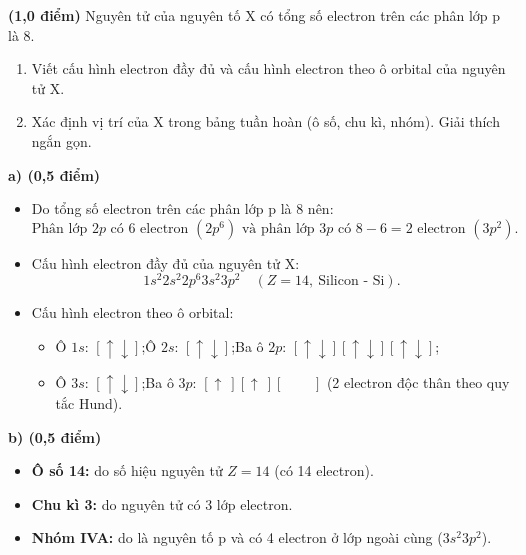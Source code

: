 \documentclass[11pt,a4paper]{article}
\begin{document}
\begin{ex}%
\textbf{(1,0 điểm)} Nguyên tử của nguyên tố X có tổng số electron trên các phân lớp p là 8.
\begin{enumerate}[label=\textbf{\alph*)}]
\item Viết cấu hình electron đầy đủ và cấu hình electron theo ô orbital của nguyên tử X.
\item Xác định vị trí của X trong bảng tuần hoàn (ô số, chu kì, nhóm). Giải thích ngắn gọn.
\end{enumerate}
\begin{loigiai}
\textbf{a) (0,5 điểm)}
\begin{itemize}[leftmargin=0.8cm]
\item Do tổng số electron trên các phân lớp p là 8 nên:
$$\text{Phân lớp } 2p \text{ có 6 electron } (2p^6) \text{ và phân lớp } 3p \text{ có } 8 - 6 = 2 \text{ electron } (3p^2).$$
\item Cấu hình electron đầy đủ của nguyên tử X:
$$1s^2 2s^2 2p^6 3s^2 3p^2 \quad (Z = 14,\ \text{Silicon - Si}).$$
\item Cấu hình electron theo ô orbital:
\begin{itemize}
\item Ô $1s$: $[\uparrow\downarrow]$;\quad Ô $2s$: $[\uparrow\downarrow]$;\quad Ba ô $2p$: $[\uparrow\downarrow][\uparrow\downarrow][\uparrow\downarrow]$;
\item Ô $3s$: $[\uparrow\downarrow]$;\quad Ba ô $3p$: $[\uparrow\ ][\uparrow\ ][\phantom{\uparrow\downarrow}]$ (2 electron độc thân theo quy tắc Hund).
\end{itemize}
\end{itemize}

\textbf{b) (0,5 điểm)}
\begin{itemize}[leftmargin=0.8cm]
\item \textbf{Ô số 14:} do số hiệu nguyên tử $Z = 14$ (có 14 electron).
\item \textbf{Chu kì 3:} do nguyên tử có 3 lớp electron.
\item \textbf{Nhóm IVA:} do là nguyên tố p và có 4 electron ở lớp ngoài cùng ($3s^2 3p^2$).
\end{itemize}
\end{loigiai}
\end{ex}
\end{document}
